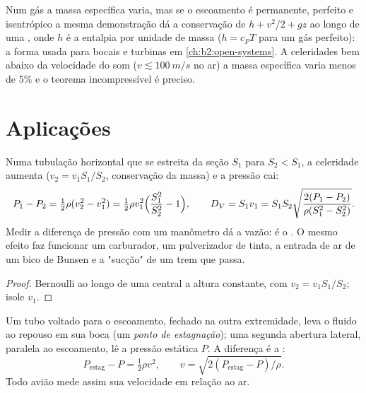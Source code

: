 \begin{remark}\label{rem:b2:euler-bernoulli:compressible}
Num gás a massa específica varia, mas se o escoamento é permanente, perfeito e
isentrópico a mesma demonstração dá a conservação de $h + v^2/2 + gz$
ao longo de uma , onde $h$ é a entalpia por unidade de massa ($h = c_PT$
para um gás perfeito): a forma usada para bocais e turbinas em
\cref{ch:b2:open-systems}. A celeridades bem abaixo da velocidade do som
($v \lesssim \qty{100}{m/s}$ no ar) a massa específica varia menos de $5\%$
e o teorema incompressível é preciso.
\end{remark}

\section{Aplicações}

\begin{proposition}\label{prop:b2:euler-bernoulli:venturi}
Numa tubulação horizontal que se estreita da seção $S_1$ para $S_2 < S_1$, a
celeridade aumenta ($v_2 = v_1S_1/S_2$, conservação da massa) e a pressão
cai:
\[
P_1 - P_2 = \tfrac12\rho(v_2^2 - v_1^2) = \tfrac12\rho v_1^2\Bigl(\frac{S_1^2}{S_2^2} - 1\Bigr) ,
\qquad
D_V = S_1v_1 = S_1S_2\sqrt{\frac{2(P_1 - P_2)}{\rho(S_1^2 - S_2^2)}} .
\]
Medir a diferença de pressão com um manômetro dá a vazão:
é o \emph{}. O mesmo efeito faz funcionar um carburador, um
pulverizador de tinta, a entrada de ar de um bico de Bunsen e a "sucção" de um
trem que passa.
\end{proposition}

\begin{proof}
Bernoulli ao longo de uma  central a altura constante, com $v_2 =
v_1S_1/S_2$; isole $v_1$.
\end{proof}

\begin{proposition}\label{prop:b2:euler-bernoulli:pitot}
Um tubo voltado para o escoamento, fechado na outra extremidade, leva o fluido ao repouso
em sua boca (um \emph{ponto de estagnação}); uma segunda abertura lateral,
paralela ao escoamento, lê a pressão estática $P$. A diferença é
a :
\[
P_{\text{estag}} - P = \tfrac12\rho v^2 , \qquad v = \sqrt{2(P_{\text{estag}} - P)/\rho} .
\]
Todo avião mede assim sua velocidade em relação ao ar.
\end{proposition}

